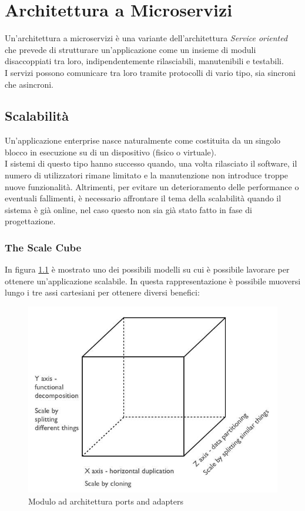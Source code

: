 \chapter{Architettura a Microservizi}

Un'architettura a microservizi è una variante dell'architettura \textit{Service oriented} che prevede di strutturare un'applicazione come un insieme di moduli disaccoppiati tra loro, indipendentemente rilasciabili, manutenibili e testabili.\\
I servizi possono comunicare tra loro tramite protocolli di vario tipo, sia sincroni che asincroni.

\section{Scalabilità}
Un'applicazione enterprise nasce naturalmente come costituita da un singolo blocco in esecuzione su di un dispositivo (fisico o virtuale).\\
I sistemi di questo tipo hanno successo quando, una volta rilasciato il software, il numero di utilizzatori rimane limitato e la manutenzione non introduce troppe nuove funzionalità.
Altrimenti, per evitare un deterioramento delle performance o eventuali fallimenti, è necessario affrontare il tema della scalabilità quando il sistema è già online, nel caso questo non sia già stato fatto in fase di progettazione.

\subsection{The Scale Cube}
In figura \ref{fig:scale-cube}\cite{the_art_of_scalability} è mostrato uno dei possibili modelli su cui è possibile lavorare per ottenere un'applicazione scalabile.
In questa rappresentazione è possibile muoversi lungo i tre assi cartesiani per ottenere diversi benefici:

\begin{figure}[h]
	\centering
	\includegraphics[scale=0.5]{img/scale-cube}
	\caption{Modulo ad architettura ports and adapters}
	\label{fig:scale-cube}
\end{figure}



